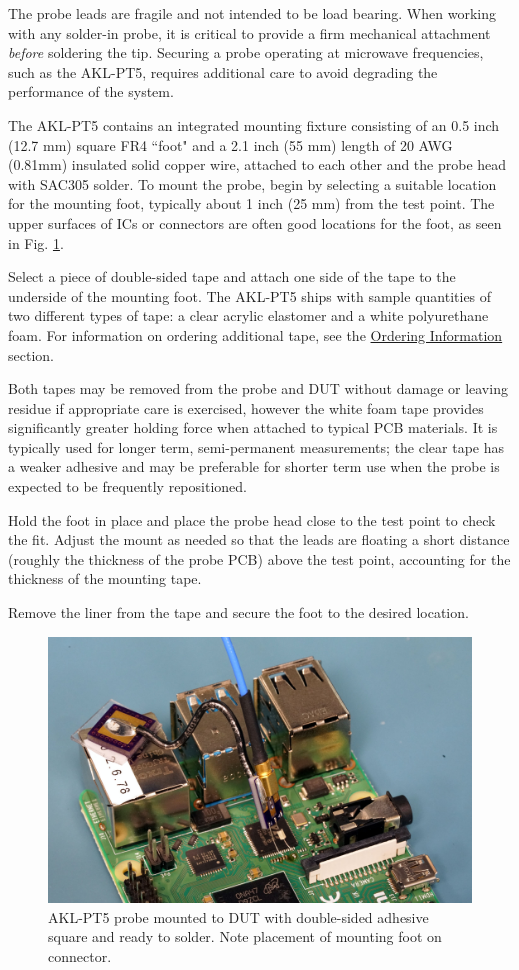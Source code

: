 \documentclass[11pt]{article}
\begin{document}
The probe leads are fragile and not intended to be load bearing. When working with any solder-in probe, it is critical
to provide a firm mechanical attachment \emph{before} soldering the tip. Securing a probe operating at microwave
frequencies, such as the AKL-PT5, requires additional care to avoid degrading the performance of the system.

The AKL-PT5 contains an integrated mounting fixture consisting of an 0.5 inch (12.7 mm) square FR4 ``foot" and a 2.1
inch (55 mm) length of 20 AWG (0.81mm) insulated solid copper wire, attached to each other and the probe head with
SAC305 solder. To mount the probe, begin by selecting a suitable location for the mounting foot, typically about 1 inch
(25 mm) from the test point. The upper surfaces of ICs or connectors are often good locations for the foot, as seen in
Fig. \ref{placement}.

Select a piece of double-sided tape and attach one side of the tape to the underside of the mounting foot. The AKL-PT5
ships with sample quantities of two different types of tape: a clear acrylic elastomer and a white polyurethane foam.
For information on ordering additional tape, see the \hyperref[ordering-info]{Ordering Information} section.

Both tapes may be removed from the probe and DUT without damage or leaving residue if appropriate care is exercised,
however the white foam tape provides significantly greater holding force when attached to typical PCB materials. It is
typically used for longer term, semi-permanent measurements; the clear tape has a weaker adhesive and may be preferable
for shorter term use when the probe is expected to be frequently repositioned.

Hold the foot in place and place the probe head close to the test point to check the fit. Adjust the mount as needed so
that the leads are floating a short distance (roughly the thickness of the probe PCB) above the test point, accounting
for the thickness of the mounting tape.

Remove the liner from the tape and secure the foot to the desired location.

\begin{figure}[h]
\centering
\includegraphics[width=12cm]{placement.jpg}
\caption{AKL-PT5 probe mounted to DUT with double-sided adhesive square and ready to solder.
Note placement of mounting foot on connector.}
\label{placement}
\end{figure}
\end{document}
